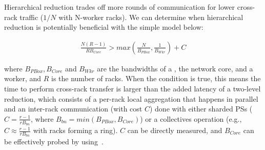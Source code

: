 Hierarchical reduction trades off more rounds of communication for lower cross-rack traffic ($1/N$ with N-worker racks). We can determine when hierarchical reduction is potentially beneficial with the simple model below:

\begin{align*}
	 \frac{N(R-1)}{RB_{Core}} >  max(\frac{N}{B_{PBox}}, \frac{1}{B_{Wkr}}) + C
\end{align*}

where $B_{PBox}, B_{Core}$ and $B_{Wkr}$ are the bandwidths of a \pbox, the network core, and a worker, and $R$ is the number of racks. When the condition is true, this means the time to perform cross-rack transfer is larger than the added latency of a two-level reduction, which consists of a per-rack local aggregation that happens in parallel and an inter-rack communication (with cost $C$) done with either sharded PSs ($C=\frac{r-1}{rB_{bn}}$, where $B_{bn} = min(B_{PBox}, B_{Core})$) or a collectives operation (e.g., $C\approx\frac{r-1}{rB_{bn}}$ with racks forming a ring). $C$ can be directly measured, and $B_{Core}$ can be effectively probed by using~\cite{hu2002estimating,hu2003evaluation}.
